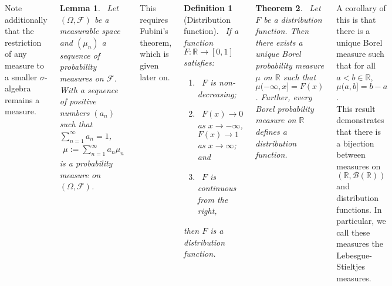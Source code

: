 \documentclass{tikzposter} %
\newcommand\leftopen[2]{\ensuremath{(#1,#2]}}
\newtheorem{theorem}{Theorem}
\newtheorem{lemma}[theorem]{Lemma}
\newtheorem{definition}{Definition}
\begin{document}
\begin{columns}
{    Note additionally that the restriction of any measure to a smaller $\sigma$-algebra remains a measure. \\

    \begin{lemma}
      \ Let $(\Omega, \mathcal{F})$ be a measurable space and $(\mu_{n})$ a sequence of probability measures on $\mathcal{F}$. With a sequence of positive numbers $(a_{n})$ such that $\sum_{n = 1}^{\infty} a_{n} = 1$,
      \begin{align*}
        \mu := \sum_{n=1}^{\infty} a_{n}\mu_{n}
      \end{align*}
      is a probability measure on $(\Omega, \mathcal{F})$.
    \end{lemma}
    \hphantom{}

    This requires Fubini's theorem, which is given later on. \\

    \begin{definition}[Distribution function]
    \ If a function $F : \mathbb{R} \to [0,1]$ satisfies:
    \begin{enumerate}[label=\roman*.]
          \item \ $F$ is non-decreasing;
          \item \ $F(x) \to 0$ as $x \to -\infty$, $F(x) \to 1$ as $x \to \infty$; and
            \item \ $F$ is continuous from the right,
    \end{enumerate}
    then $F$ is a distribution function.
    \end{definition}
    \hphantom{}

    \begin{theorem}
    \ Let $F$ be a distribution function. Then there exists a unique Borel probability measure $\mu$ on $\mathbb{R}$ such that $\mu\leftopen{-\infty}{x} = F(x)$. Further, every Borel probability measure on $\mathbb{R}$ defines a distribution function.
    \end{theorem}
    \hphantom{}

    A corollary of this is that there is a unique Borel measure such that for all $a < b \in \mathbb{R}$, $\mu\leftopen{a}{b} = b-a$. \\

    This result demonstrates that there is a bijection between measures on $(\mathbb{R}, \mathcal{B}(\mathbb{R}))$ and distribution functions. In particular, we call these measures the Lebesgue-Stieltjes measures. \\

}
\end{columns}
\end{document}
